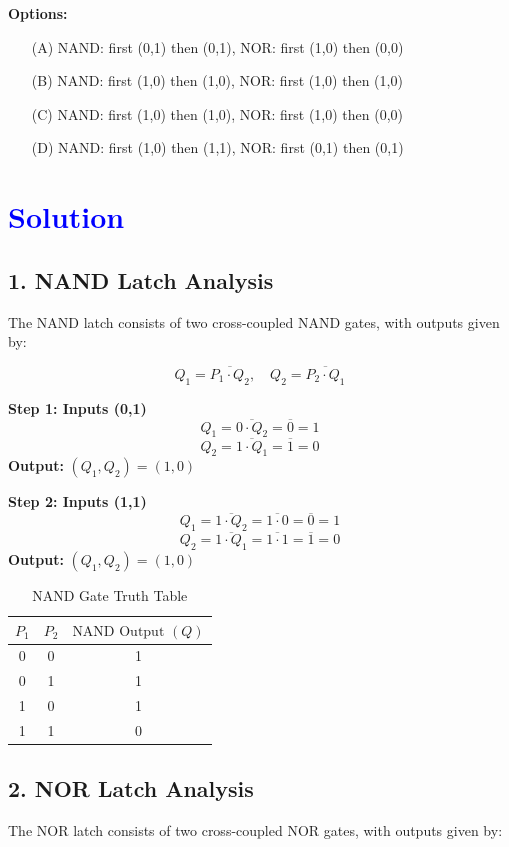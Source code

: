 \documentclass[a4paper,12pt]{article}
\begin{document}
\vspace{1cm}
\textbf{Options:}
\begin{enumerate}
    \item[(A)] NAND: first (0,1) then (0,1), NOR: first (1,0) then (0,0)
    \item[(B)] NAND: first (1,0) then (1,0), NOR: first (1,0) then (1,0)
    \item[(C)] NAND: first (1,0) then (1,0), NOR: first (1,0) then (0,0)
    \item[(D)] NAND: first (1,0) then (1,1), NOR: first (0,1) then (0,1)
\end{enumerate}

\section*{\textcolor{blue}{Solution}}

\subsection*{1. NAND Latch Analysis}
The NAND latch consists of two cross-coupled NAND gates, with outputs given by:

\[
Q_1 = \overline{P_1 \cdot Q_2}, \quad Q_2 = \overline{P_2 \cdot Q_1}
\]

\textbf{Step 1: Inputs (0,1)}
\[
Q_1 = \overline{0 \cdot Q_2} = \overline{0} = 1
\]
\[
Q_2 = \overline{1 \cdot Q_1} = \overline{1} = 0
\]
\textbf{Output:} \( (Q_1, Q_2) = (1,0) \)

\textbf{Step 2: Inputs (1,1)}
\[
Q_1 = \overline{1 \cdot Q_2} = \overline{1 \cdot 0} = \overline{0} = 1
\]
\[
Q_2 = \overline{1 \cdot Q_1} = \overline{1 \cdot 1} = \overline{1} = 0
\]
\textbf{Output:} \( (Q_1, Q_2) = (1,0) \)

\begin{table}[h]
    \centering
    \renewcommand{\arraystretch}{1.2}
    \begin{tabular}{|c|c|c|}
        \hline
        $P_1$ & $P_2$ & $\text{NAND Output } (Q)$ \\
        \hline
        0 & 0 & 1 \\
        0 & 1 & 1 \\
        1 & 0 & 1 \\
        1 & 1 & 0 \\
        \hline
    \end{tabular}
    \caption{NAND Gate Truth Table}
\end{table}

\subsection*{2. NOR Latch Analysis}
The NOR latch consists of two cross-coupled NOR gates, with outputs given by:
\end{document}
